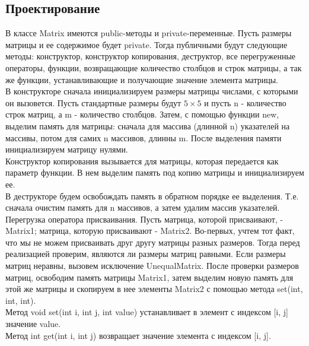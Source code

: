 \documentclass[12pt,a4paper]{report}
\begin{document}
\subsection{Проектирование}
В классе Matrix имеются public-методы и private-переменные. Пусть размеры матрицы и ее содержимое будет private. Тогда публичными будут следующие методы: конструктор, конструктор копирования, деструктор, все перегруженные операторы, функции, возвращающие количество столбцов и строк матрицы, а так же функции, устанавливающие и получающие значение элемента матрицы. \\
В конструкторе сначала инициализируем размеры матрицы числами, с которыми он вызовется. Пусть стандартные размеры будут $5\times5$ и пусть n - количество строк матриц, а m - количество столбцов. Затем, с помощью функции new, выделим память для матрицы: сначала для массива (длинной n) указателей на массивы, потом для самих n массивов, длинны m. После выделения памяти инициализируем матрицу нулями. \\
Конструктор копирования вызывается для матрицы, которая передается как параметр функции. В нем выделим память под копию матрицы и инициализируем ее. \\
В деструкторе будем освобождать память в обратном порядке ее выделения. Т.е. сначала очистим память для n массивов, а затем удалим массив указателей. \\
Перегрузка оператора присваивания. Пусть матрица, которой присваивают, - Matrix1; матрица, которую присваивают - Matrix2. Во-первых, учтем тот факт, что мы не можем присваивать друг другу матрицы разных размеров. Тогда перед реализацией проверим, являются ли размеры матриц равными. Если размеры матриц неравны, вызовем исключение UnequalMatrix. После проверки размеров матриц, освободим память матрицы Matrix1, затем выделим новую память для этой же матрицы и скопируем в нее элементы Matrix2 с помощью метода set(int, int, int).\\
Метод void set(int i, int j, int value) устанавливает в элемент с индексом [i, j] значение value. \\
Метод int get(int i, int j) возвращает значение элемента с индексом [i, j]. \\
\end{document}
